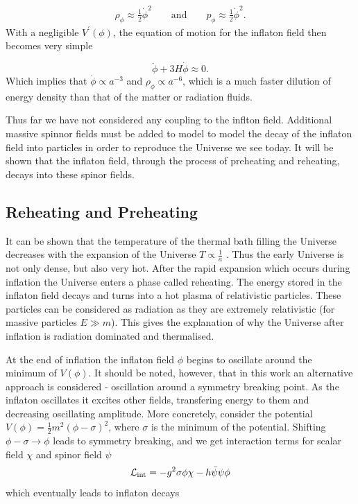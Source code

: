 \begin{eqnarray}
    \rho_{\phi} \approx \frac{1}{2} \dot{\phi}^2 \qquad \text{and} \qquad p_{\phi} \approx \frac{1}{2} \dot{\phi}^2.
\end{eqnarray}
With a negligible $V^{\prime}(\phi)$, the equation of motion for the inflaton field then becomes very simple

\begin{equation}
    \ddot{\phi} + 3 H \dot{\phi} \approx 0.
\end{equation}
Which implies that $\dot{\phi} \propto a^{-3}$ and $\rho_{\phi} \propto a^{-6}$, which is a much faster dilution of energy density than that of the matter or radiation fluids.

Thus far we have not considered any coupling to the inflton field. Additional massive spinnor fields must be added to model to model the decay of the inflaton field into particles in order to reproduce the Universe we see today. It will be shown that the inflaton field, through the process of preheating and reheating, decays into these spinor fields.

\subsection{Reheating and Preheating}

It can be shown that the temperature of the thermal bath filling the Universe decreases with the expansion of the Universe $T \propto \frac{1}{a}$ \cite{dimopoulos2020introduction}. Thus the early Universe is not only dense, but also very hot. After the rapid expansion which occurs during inflation the Universe enters a phase called reheating. The energy stored in the inflaton field decays and turns into a hot plasma of relativistic particles. These particles can be considered as radiation as they are extremely relativistic (for massive particles $E \gg m$). This gives the explanation of why the Universe after inflation is radiation dominated and thermalised.

At the end of inflation the inflaton field $\phi$ begins to oscillate around the minimum of $V(\phi)$. It should be noted, however, that in this work an alternative approach is considered - oscillation around a symmetry breaking point. As the inflaton oscillates it excites other fields, transfering energy to them and decreasing oscillating amplitude. More concretely, consider the potential $V(\phi) = \frac{1}{2}m^2(\phi - \sigma)^2$, where $\sigma$ is the minimum of the potential. Shifting $\phi - \sigma \rightarrow \phi$ leads to symmetry breaking, and we get interaction terms for scalar field $\chi$ and spinor field $\psi$
\begin{equation}
    \mathcal{L}_{\rm int} = -g^2 \sigma \phi \chi - h \bar{\psi} \psi \phi
\end{equation}
which eventually leads to inflaton decays

